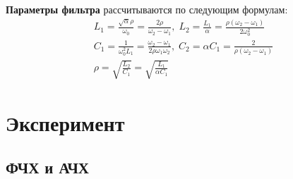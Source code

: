\textbf{Параметры фильтра} рассчитываются по следующим формулам:
\begin{equation}
\label{eq:7.8}
\begin{gathered}
L_1=\frac{\sqrt{\alpha}\rho}{\omega_0}=\frac{2\rho}{\omega_2-\omega_1},\;
L_2=\frac{L_1}{\alpha}=\frac{\rho(\omega_2-\omega_1)}{2\omega^2_0}\\
C_1=\frac{1}{\omega^2_0L_1}=\frac{\omega_2-\omega_1}{2\rho\omega_1\omega_2},\;
C_2=\alpha C_1=\frac{2}{\rho(\omega_2-\omega_1)}\\
\rho=\sqrt{\frac{L_2}{C_1}}=\sqrt{\frac{L_1}{\alpha C_1}}
\end{gathered}
\end{equation}
\section{Эксперимент}
\subsection{ФЧХ и АЧХ}



